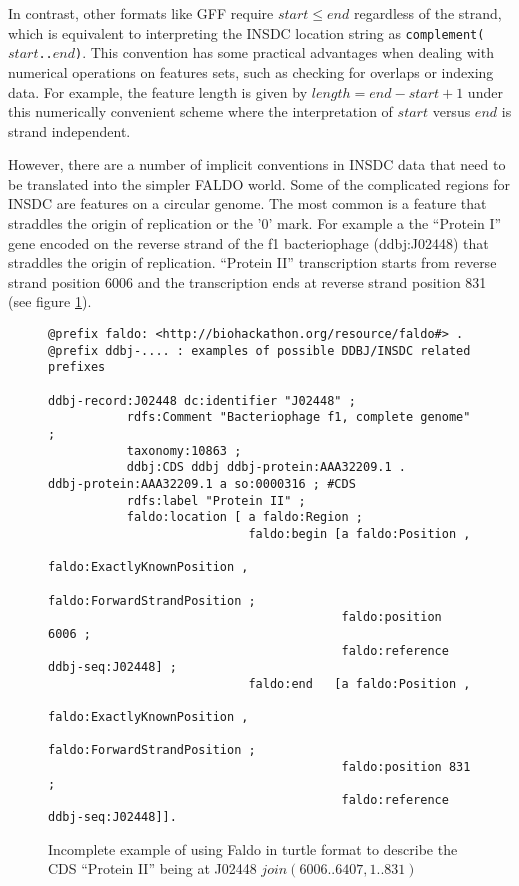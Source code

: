 In contrast, other formats like GFF require $start \leq end$
regardless of the strand, which is equivalent to interpreting
the INSDC location string as \texttt{complement($start$..$end$)}.
This convention has some practical advantages when
dealing with numerical operations on features sets, such as
checking for overlaps or indexing data. For example, the
feature length is given by $length = end - start + 1$ under
this numerically convenient scheme where the interpretation
of $start$ versus $end$ is strand independent.

However, there are a number of implicit conventions in INSDC data that need to be translated into the simpler FALDO world.
Some of the complicated regions for INSDC are features on a circular genome. 
The most common is  a feature that straddles the origin of replication or the '0' mark.
For example a the ``Protein I'' gene encoded on the reverse strand of the f1 bacteriophage (ddbj:J02448) that straddles the origin of replication.
``Protein II'' transcription starts from reverse strand position 6006 and the transcription ends at reverse strand position  831 (see figure \ref{fig:insdcReverseOverOrigin}).


\begin{figure}
\begin{shaded}
\small
\begin{verbatim}
@prefix faldo: <http://biohackathon.org/resource/faldo#> .
@prefix ddbj-.... : examples of possible DDBJ/INSDC related prefixes

ddbj-record:J02448 dc:identifier "J02448" ;
           rdfs:Comment "Bacteriophage f1, complete genome" ;
           taxonomy:10863 ;
           ddbj:CDS ddbj ddbj-protein:AAA32209.1 .
ddbj-protein:AAA32209.1 a so:0000316 ; #CDS
           rdfs:label "Protein II" ;
           faldo:location [ a faldo:Region ;
                            faldo:begin [a faldo:Position ,
                                           faldo:ExactlyKnownPosition ,
                                           faldo:ForwardStrandPosition ;
                                         faldo:position 6006 ;
                                         faldo:reference ddbj-seq:J02448] ;
                            faldo:end   [a faldo:Position , 
                                           faldo:ExactlyKnownPosition ,
                                           faldo:ForwardStrandPosition ;
                                         faldo:position 831 ;
                                         faldo:reference ddbj-seq:J02448]].
\end{verbatim}
\end{shaded}
\caption{Incomplete example of using Faldo in turtle format to describe
the CDS ``Protein II'' being at J02448 $join(6006..6407,1..831)$}
\label{fig:insdcReverseOverOrigin}
\end{figure}


